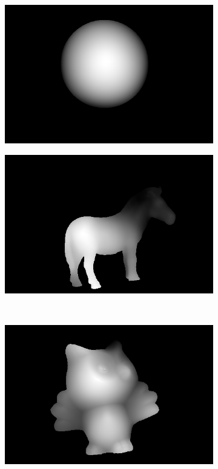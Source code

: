 \documentclass{paper}
\begin{document}
\begin{figure}[h!]
\begin{subfigure}{0.3\textwidth}
        \end{subfigure}
        ~ 
        \begin{subfigure}{0.3\textwidth}
                \includegraphics[width=\textwidth]{report_fig/gray_d}
        \end{subfigure}
        \begin{subfigure}{0.3\textwidth}
                \includegraphics[width=\textwidth]{report_fig/horse_d}
        \end{subfigure}
        ~ 
        \begin{subfigure}{0.3\textwidth}
                \includegraphics[width=\textwidth]{report_fig/owl_d}

\end{subfigure}
\end{figure}
\end{document}

